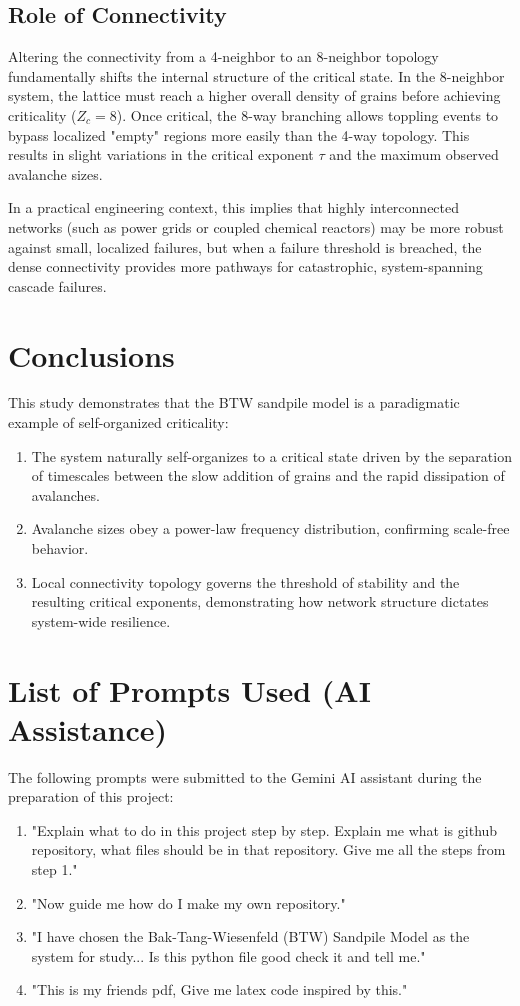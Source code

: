 \documentclass[11pt, a4paper]{article}
\begin{document}
\subsection{Role of Connectivity}
Altering the connectivity from a 4-neighbor to an 8-neighbor topology fundamentally shifts the internal structure of the critical state. In the 8-neighbor system, the lattice must reach a higher overall density of grains before achieving criticality ($Z_c=8$). Once critical, the 8-way branching allows toppling events to bypass localized "empty" regions more easily than the 4-way topology. This results in slight variations in the critical exponent $\tau$ and the maximum observed avalanche sizes.

In a practical engineering context, this implies that highly interconnected networks (such as power grids or coupled chemical reactors) may be more robust against small, localized failures, but when a failure threshold is breached, the dense connectivity provides more pathways for catastrophic, system-spanning cascade failures.

\section{Conclusions}
This study demonstrates that the BTW sandpile model is a paradigmatic example of self-organized criticality:
\begin{enumerate}
    \item The system naturally self-organizes to a critical state driven by the separation of timescales between the slow addition of grains and the rapid dissipation of avalanches.
    \item Avalanche sizes obey a power-law frequency distribution, confirming scale-free behavior.
    \item Local connectivity topology governs the threshold of stability and the resulting critical exponents, demonstrating how network structure dictates system-wide resilience.
\end{enumerate}

\section*{List of Prompts Used (AI Assistance)}
The following prompts were submitted to the Gemini AI assistant during the preparation of this project:
\begin{enumerate}
    \item "Explain what to do in this project step by step. Explain me what is github repository, what files should be in that repository. Give me all the steps from step 1."
    \item "Now guide me how do I make my own repository."
    \item "I have chosen the Bak-Tang-Wiesenfeld (BTW) Sandpile Model as the system for study... Is this python file good check it and tell me."
    \item "This is my friends pdf, Give me latex code inspired by this."
\end{enumerate}
\end{document}
